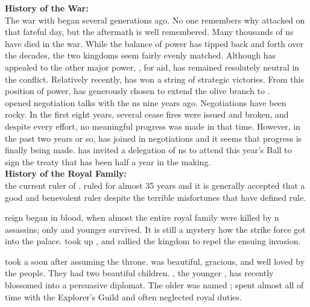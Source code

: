 \documentclass[blue]{NeptuneBall}
\begin{document}
\name{\bAtlantican{}}



{\bf History of the War:}\\
The war with \pPacifica{} began several generations ago. No one remembers why \pPacifica{} attacked on that fateful day, but the aftermath is well remembered. Many thousands of \pAtlantis{}ns have died in the war. While the balance of power has tipped back and forth over the decades, the two kingdoms seem fairly evenly matched. Although \pAtlantis{} has appealed to the other major power, \pIndia{}, for aid, \pIndia{} has remained resolutely neutral in the conflict. Relatively recently, \pAtlantis{} has won a string of strategic victories. From this position of power, \cKing{\King} \cKing{} has generously chosen to extend the olive branch to \pPacifica{}.\\

\cKing{\King} \cKing{} opened negotiation talks with the \pPacifica{}ns nine years ago. Negotiations have been rocky. In the first eight years, several cease fires were issued and broken, and despite every effort, no meaningful progress was made in that time. However, in the past two years or so, \cPrincess{\Prince} \cPrincess{} has joined \cPrincess{\their} \cKing{\parent} in negotiations and it seems that progress is finally being made. \cKing{\King} \cKing{} has invited a delegation of \pPacifica{}ns to attend this year's \cExExKing{} Ball to sign the treaty that has been half a year in the making.\\


{\bf History of the Royal Family:}\\
\cKing{\King} \cKing{} \cKing{\are} the current ruler of \pAtlantis{}. \cKing{\They} \cKing{\have} ruled for almost 35 years and it is generally accepted that \cKing{\they} \cKing{\are} a good and benevolent ruler despite the terrible misfortunes that have defined \cKing{\their} rule.

\cKing{\Their} reign began in blood, when almost the entire royal family were killed by \pPacifica{}n assassins; only \cKing{} and \cKing{\their} younger \cPlant{\sibling} \cPlant{} survived. It is still a mystery how the strike force got into the palace. \cKing{} took up \iTrident{\MYname{}}, and rallied the kingdom to repel the ensuing invasion.

\cKing{\King} \cKing{} took a \cQueen{\spouse} soon after assuming the throne. \cQueen{\King} \cQueen{} was beautiful, gracious, and well loved by the people. They had two beautiful children. \cPrincess{\Prince} \cPrincess{}, the younger \cPrincess{\offspring}, has recently blossomed into a persuasive diplomat. The older \cAriel{\Prince} was named \cAriel{}; \cAriel{} spent almost all of \cAriel{\their} time with the Explorer's Guild and often neglected \cAriel{\their} royal duties. 
\end{document}
